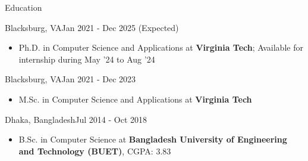 \documentclass[]{mcdowellcv}
\begin{document}
	\makeheader
	
	\begin{cvsection}{Education}
		\begin{cvsubsection}{Blacksburg, VA}{}{Jan 2021 - Dec 2025 (Expected)}
			\begin{itemize}
				\item Ph.D. in Computer Science and Applications at \textbf{Virginia Tech}; Available for internship during May '24 to Aug '24 %
			\end{itemize}
		\end{cvsubsection}
		\begin{cvsubsection}{Blacksburg, VA}{}{Jan 2021 - Dec 2023}
			\begin{itemize}
				\item M.Sc. in Computer Science and Applications at \textbf{Virginia Tech}
			\end{itemize}
		\end{cvsubsection}
		\begin{cvsubsection}{Dhaka, Bangladesh}{}{Jul 2014 - Oct 2018}
			\begin{itemize}
				\item B.Sc. in Computer Science at \textbf{Bangladesh University of Engineering and Technology (BUET)}, CGPA: 3.83
			\end{itemize}
		\end{cvsubsection}
	\end{cvsection}
\end{document}
